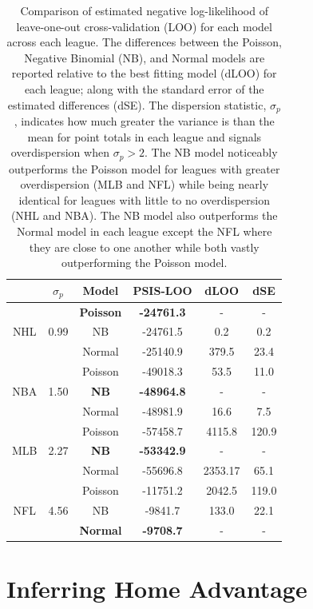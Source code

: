 \begin{table}
\centering
\begin{tabular}{c@{\hskip0.35in}c@{\hskip0.35in}c@{\hskip 0.25in}c@{\hskip 0.25in}c@{\hskip 0.15in}c}
\toprule
& \boldmath$\sigma_p$ & \textbf{Model} & \textbf{PSIS-LOO} & \textbf{dLOO} & \textbf{dSE}\\
\midrule
&& \textbf{Poisson} & \textbf{-24761.3} & - & -\\
NHL & 0.99 & NB & -24761.5 & 0.2 & 0.2\\
&& Normal & -25140.9 & 379.5 & 23.4\\
\midrule
&& Poisson & -49018.3 & 53.5 & 11.0\\
NBA & 1.50 & \textbf{NB} & \textbf{-48964.8} & - & -\\
&& Normal & -48981.9 & 16.6 & 7.5\\
\midrule
&& Poisson & -57458.7 & 4115.8 & 120.9\\
MLB & 2.27 & \textbf{NB} & \textbf{-53342.9} & - & -\\
&& Normal & -55696.8 & 2353.17 & 65.1\\
\midrule
&& Poisson & -11751.2 & 2042.5 & 119.0\\
NFL & 4.56 & NB & -9841.7 & 133.0 & 22.1\\
&& \textbf{Normal} & \textbf{-9708.7} & - & -\\
\bottomrule
\end{tabular}
\caption{Comparison of estimated negative log-likelihood of leave-one-out cross-validation (LOO) for each model across each league. The differences between the Poisson, Negative Binomial (NB), and Normal models are reported relative to the best fitting model (dLOO) for each league; along with the standard error of the estimated differences (dSE). The dispersion statistic, \(\sigma_p\), indicates how much greater the variance is than the mean for point totals in each league and signals overdispersion when \(\sigma_p > 2\). The NB model noticeably outperforms the Poisson model for leagues with greater overdispersion (MLB and NFL) while being nearly identical for leagues with little to no overdispersion (NHL and NBA). The NB model also outperforms the Normal model in each league except the NFL where they are close to one another while both vastly outperforming the Poisson model.}\label{tab:loo}
\end{table}

\section{Inferring Home Advantage}


